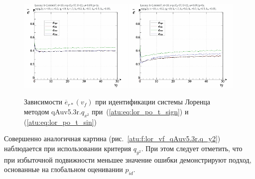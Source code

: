 \begin{figure}[h!]
  \centerline{
    \includegraphics[width=0.49\textwidth]{p/cha/lor/qAuv5.3r/lor_qAuv5_3r_qx2-p_v_f_e_sign.png}
    \hfill
    \includegraphics[width=0.49\textwidth]{p/cha/lor/qAuv5.3r/lor_qAuv5_3r_qx2-p_v_f_e_sin.png}
  }
  \caption{Зависимости $\overline{e}_{r*}(v_f)$ при идентификации системы Лоренца методом qAuv5.3r.$q_{x^2}$
   при~(\ref{atu:eq:lor_po_t_sign}) и (\ref{atu:eq:lor_po_t_sin})}
  \label{atu:f:lor_vf_qAuv5.3r.q_x2}
\end{figure}

Совершенно аналогичная картина
(рис.~\ref{atu:f:lor_vf_qAuv5.3r.q_y2})
наблюдается при использовании критерия $q_{y^2}$.
При этом следует отметить, что при избыточной подвижности
меньшее значение ошибки демонстрируют
подход, основанные на глобальном оценивании $p_{id}$.


